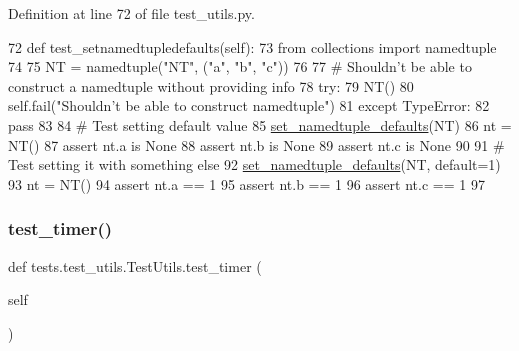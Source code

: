 Definition at line 72 of file test\+\_\+utils.\+py.


\begin{DoxyCode}
72     \textcolor{keyword}{def }test\_setnamedtupledefaults(self):
73         \textcolor{keyword}{from} collections \textcolor{keyword}{import} namedtuple
74 
75         NT = namedtuple(\textcolor{stringliteral}{"NT"}, (\textcolor{stringliteral}{"a"}, \textcolor{stringliteral}{"b"}, \textcolor{stringliteral}{"c"}))
76 
77         \textcolor{comment}{# Shouldn't be able to construct a namedtuple without providing info}
78         \textcolor{keywordflow}{try}:
79             NT()
80             self.fail(\textcolor{stringliteral}{"Shouldn't be able to construct namedtuple"})
81         \textcolor{keywordflow}{except} TypeError:
82             \textcolor{keywordflow}{pass}
83 
84         \textcolor{comment}{# Test setting default value}
85         \hyperlink{namespaceparlai_1_1agents_1_1legacy__agents_1_1seq2seq_1_1utils__v1_a17553492abb2e671bc3fc58e1e3a96b0}{set\_namedtuple\_defaults}(NT)
86         nt = NT()
87         \textcolor{keyword}{assert} nt.a \textcolor{keywordflow}{is} \textcolor{keywordtype}{None}
88         \textcolor{keyword}{assert} nt.b \textcolor{keywordflow}{is} \textcolor{keywordtype}{None}
89         \textcolor{keyword}{assert} nt.c \textcolor{keywordflow}{is} \textcolor{keywordtype}{None}
90 
91         \textcolor{comment}{# Test setting it with something else}
92         \hyperlink{namespaceparlai_1_1agents_1_1legacy__agents_1_1seq2seq_1_1utils__v1_a17553492abb2e671bc3fc58e1e3a96b0}{set\_namedtuple\_defaults}(NT, default=1)
93         nt = NT()
94         \textcolor{keyword}{assert} nt.a == 1
95         \textcolor{keyword}{assert} nt.b == 1
96         \textcolor{keyword}{assert} nt.c == 1
97 
\end{DoxyCode}
\mbox{\label{classtests_1_1test__utils_1_1TestUtils_aa4b5f19e38d6da7a8947226c60007184}} 
\subsubsection{\texorpdfstring{test\+\_\+timer()}{test\_timer()}}
{\footnotesize\ttfamily def tests.\+test\+\_\+utils.\+Test\+Utils.\+test\+\_\+timer (\begin{DoxyParamCaption}\item[{}]{self }\end{DoxyParamCaption})}



